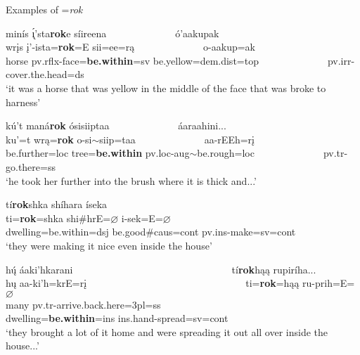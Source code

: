 \begin{exe}

\item\label{ExamplesOfRok} Examples of =\textit{rok}

\begin{xlist}

\item\label{ExamplesOfRok1} \glll minís \'{ı̨}'sta\textbf{rok}e síireena ~ ~ ~ ~ ~ ~ ~ ~ ó'aakupak\\
    wrįs į'-ista=\textbf{rok}=E sii=ee=rą ~ ~ ~ ~ ~ ~ ~ ~  o-aakup=ak\\
    \textnormal{horse} pv.rflx-\textnormal{face}=\textbf{\textnormal{be.within}}=sv \textnormal{be.yellow}=dem.dist=top ~ ~ ~ ~ ~ ~ ~ ~  pv.irr-\textnormal{cover.the.head}=ds\\
    \glt `it was a horse that was yellow in the middle of the face that was broke to harness' \citep[59]{hollow1973a}
    
\item\label{ExamplesOfRok2} \glll kú't maná\textbf{rok} ósisiiptaa ~ ~ ~ ~ ~ ~ ~ ~ áaraahini...\\
    ku'=t wrą=\textbf{rok} o-si$\sim$siip=taa ~ ~ ~ ~ ~ ~ ~ ~ aa-rEEh=rį\\
    \textnormal{be.further}=loc \textnormal{tree}=\textbf{\textnormal{be.within}} pv.loc-aug$\sim$\textnormal{be.rough}=loc ~ ~ ~ ~ ~ ~ ~ ~ pv.tr-\textnormal{go.there}=ss\\
    \glt `he took her further into the brush where it is thick and...' \citep[176]{hollow1973a}


\item\label{ExamplesOfRok3} \glll tí\textbf{rok}shka shíhara íseka\\
    ti=\textbf{rok}=shka shi\#hrE=$\varnothing$ i-sek=E=$\varnothing$\\
    \textnormal{dwelling}=\textnormal{be.within}=dsj \textnormal{be.good}\#caus=cont pv.ins-\textnormal{make}=sv=cont\\
    \glt `they were making it nice even inside the house' \citep[202]{hollow1973a}
    
\item\label{ExamplesOfRok4} \glll hų́ áaki'hkarani ~ ~ ~ ~ ~ ~ ~ ~ ~ ~ ~ ~ ~ ~ ~ ~ ~ ~ ~ tí\textbf{rok}hąą rupiríha...\\
    hų aa-ki'h=krE=rį ~ ~ ~ ~ ~ ~ ~ ~ ~ ~ ~ ~ ~ ~ ~ ~ ~ ~ ~  ti=\textbf{rok}=hąą ru-prih=E=$\varnothing$\\
    \textnormal{many} pv.tr-\textnormal{arrive.back.here}=3pl=ss ~ ~ ~ ~ ~ ~ ~ ~ ~ ~ ~ ~ ~ ~ ~ ~ ~ ~ ~ \textnormal{dwelling}=\textbf{\textnormal{be.within}}=ins ins.hand-\textnormal{spread}=sv=cont\\
    \glt `they brought a lot of it home and were spreading it out all over inside the house...' \citep[184]{hollow1973a}



\end{xlist}
\end{exe}
